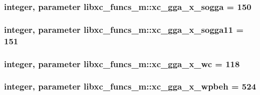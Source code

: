 \hypertarget{classlibxc__funcs__m_a4b3a8132241bff9357d3dc2cea3a9e44}{
\subsubsection[{xc\-\_\-gga\-\_\-x\-\_\-sogga}]{\setlength{\rightskip}{0pt plus 5cm}integer, parameter libxc\-\_\-funcs\-\_\-m\-::xc\-\_\-gga\-\_\-x\-\_\-sogga = 150}}\label{classlibxc__funcs__m_a4b3a8132241bff9357d3dc2cea3a9e44}
\hypertarget{classlibxc__funcs__m_af12ae836ad3229d0f6059119d7d8b059}{
\subsubsection[{xc\-\_\-gga\-\_\-x\-\_\-sogga11}]{\setlength{\rightskip}{0pt plus 5cm}integer, parameter libxc\-\_\-funcs\-\_\-m\-::xc\-\_\-gga\-\_\-x\-\_\-sogga11 = 151}}\label{classlibxc__funcs__m_af12ae836ad3229d0f6059119d7d8b059}
\hypertarget{classlibxc__funcs__m_a15a8608915b25fc8324a8f9f6e208fa8}{
\subsubsection[{xc\-\_\-gga\-\_\-x\-\_\-wc}]{\setlength{\rightskip}{0pt plus 5cm}integer, parameter libxc\-\_\-funcs\-\_\-m\-::xc\-\_\-gga\-\_\-x\-\_\-wc = 118}}\label{classlibxc__funcs__m_a15a8608915b25fc8324a8f9f6e208fa8}
\hypertarget{classlibxc__funcs__m_a948291ae88518657e047bd6fb784306e}{
\subsubsection[{xc\-\_\-gga\-\_\-x\-\_\-wpbeh}]{\setlength{\rightskip}{0pt plus 5cm}integer, parameter libxc\-\_\-funcs\-\_\-m\-::xc\-\_\-gga\-\_\-x\-\_\-wpbeh = 524}}\label{classlibxc__funcs__m_a948291ae88518657e047bd6fb784306e}
